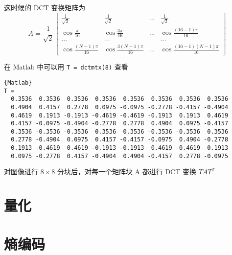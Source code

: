 这时候的 DCT 变换矩阵为
\begin{equation}
    A=\frac{1}{\sqrt{2}}
    \begin{bmatrix}
        \frac{1}{\sqrt{2}}      & \frac{1}{\sqrt{2}}        & ...   & \frac{1}{\sqrt{2}} \\
        \cos\frac{\pi}{16}      & \cos\frac{3\pi}{16}       & ...   & \cos\frac{(16-1)\pi}{16} \\
        ...                     & ...                       &       & ... \\
        \cos\frac{(N-1)\pi}{16} & \cos\frac{3(N-1)\pi}{16}  & ...   & \cos\frac{(16-1)(N-1)\pi}{16}
    \end{bmatrix}
\end{equation}

在 Matlab 中可以用 \lstinline|T = dctmtx(8)| 查看
\begin{lstlisting}{Matlab}
T =
  0.3536  0.3536  0.3536  0.3536  0.3536  0.3536  0.3536  0.3536
  0.4904  0.4157  0.2778  0.0975 -0.0975 -0.2778 -0.4157 -0.4904
  0.4619  0.1913 -0.1913 -0.4619 -0.4619 -0.1913  0.1913  0.4619
  0.4157 -0.0975 -0.4904 -0.2778  0.2778  0.4904  0.0975 -0.4157
  0.3536 -0.3536 -0.3536  0.3536  0.3536 -0.3536 -0.3536  0.3536
  0.2778 -0.4904  0.0975  0.4157 -0.4157 -0.0975  0.4904 -0.2778
  0.1913 -0.4619  0.4619 -0.1913 -0.1913  0.4619 -0.4619  0.1913
  0.0975 -0.2778  0.4157 -0.4904  0.4904 -0.4157  0.2778 -0.0975
\end{lstlisting}

对图像进行 $8\times 8$ 分块后，对每一个矩阵块 A 都进行 DCT 变换 $TAT^T$ 

\section{量化}
\section{熵编码}